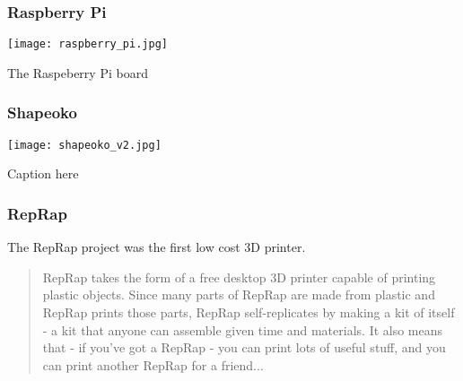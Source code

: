 \subsubsection{Raspberry Pi} %




\begin{NFfigure}
    \begin{center}
        \texttt{[image: raspberry\_pi.jpg]}
    \end{center}
    \caption{The Raspeberry Pi board}
    \label{fig:raspberry_pi}
\end{NFfigure}

\subsubsection{Shapeoko} %

\begin{NFfigure}
    \begin{center}
        \texttt{[image: shapeoko\_v2.jpg]}
    \end{center}
    \caption{Caption here}
    \label{fig:shapeoko_v2}
\end{NFfigure}

\subsubsection{RepRap} %

The RepRap project was the first low cost 3D printer.
\begin{quotation}
RepRap takes the form of a free desktop 3D printer capable of printing plastic objects. Since many parts of RepRap are made from plastic and RepRap prints those parts, RepRap self-replicates by making a kit of itself - a kit that anyone can assemble given time and materials. It also means that - if you've got a RepRap - you can print lots of useful stuff, and you can print another RepRap for a friend...
\end{quotation}



